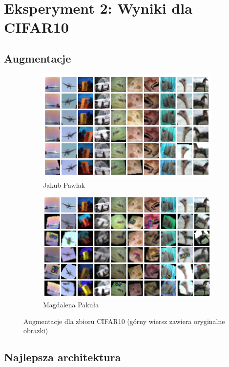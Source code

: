 \documentclass[10pt]{article}
\begin{document}
\pagebreak
\section{Eksperyment 2: Wyniki dla CIFAR10}\label{sec:ex2_cifar}

\subsection*{Augmentacje}

\begin{figure}[H]\centering
    \begin{subfigure}[t]{.45\textwidth}
        \centering
        \includegraphics[width=.7\linewidth]{img/kuba/cifar/augmentations.png}
        \caption{Jakub Pawlak}
    \end{subfigure}
    \begin{subfigure}[t]{.45\textwidth}
        \centering
        \includegraphics[width=.7\linewidth]{img/magda/augmented_CIFAR}
        \caption{Magdalena Pakuła}
    \end{subfigure}
    \caption{Augmentacje dla zbioru CIFAR10 (górny wiersz zawiera oryginalne obrazki)}
\end{figure}


\subsection*{Najlepsza architektura}
\end{document}
